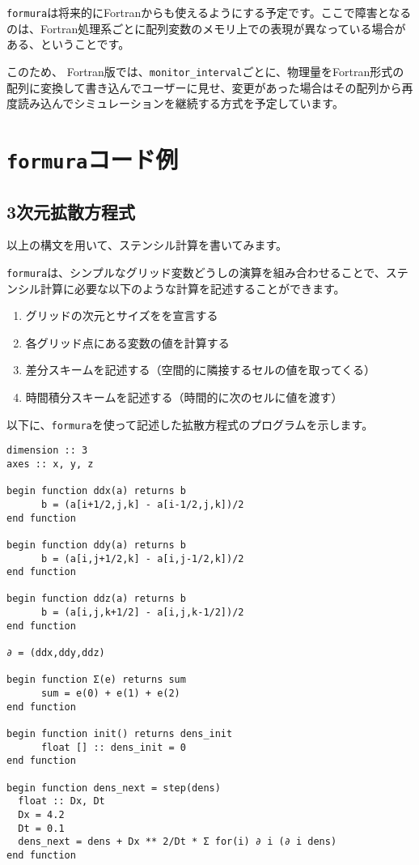 \documentclass{jsarticle}
\newcommand{\formura}{{\texttt{formura}}}
\begin{document}
\formura は将来的にFortranからも使えるようにする予定です。ここで障害となるのは、Fortran処理系ごとに配列変数のメモリ上での表現が異なっている場合がある、ということです。

このため、
Fortran版では、\verb`monitor_interval`ごとに、物理量をFortran形式の配列に変換して書き込んでユーザーに見せ、変更があった場合はその配列から再度読み込んでシミュレーションを継続する方式を予定しています。

\newpage
\section{\formura コード例}
\subsection{3次元拡散方程式}

以上の構文を用いて、ステンシル計算を書いてみます。


\formura は、シンプルなグリッド変数どうしの演算を組み合わせることで、ステンシル計算に必要な以下のような計算を記述することができます。

\begin{enumerate}
\item グリッドの次元とサイズをを宣言する
\item 各グリッド点にある変数の値を計算する
\item 差分スキームを記述する（空間的に隣接するセルの値を取ってくる）
\item 時間積分スキームを記述する（時間的に次のセルに値を渡す）
\end{enumerate}


以下に、\formura を使って記述した拡散方程式のプログラムを示します。

\begin{lstlisting}[mathescape]
dimension :: 3
axes :: x, y, z

begin function ddx(a) returns b
      b = (a[i+1/2,j,k] - a[i-1/2,j,k])/2
end function

begin function ddy(a) returns b
      b = (a[i,j+1/2,k] - a[i,j-1/2,k])/2
end function

begin function ddz(a) returns b
      b = (a[i,j,k+1/2] - a[i,j,k-1/2])/2
end function

∂ = (ddx,ddy,ddz)

begin function Σ(e) returns sum
      sum = e(0) + e(1) + e(2)
end function

begin function init() returns dens_init
      float [] :: dens_init = 0
end function

begin function dens_next = step(dens)
  float :: Dx, Dt
  Dx = 4.2
  Dt = 0.1
  dens_next = dens + Dx ** 2/Dt * Σ for(i) ∂ i (∂ i dens)
end function
\end{lstlisting}
\end{document}
